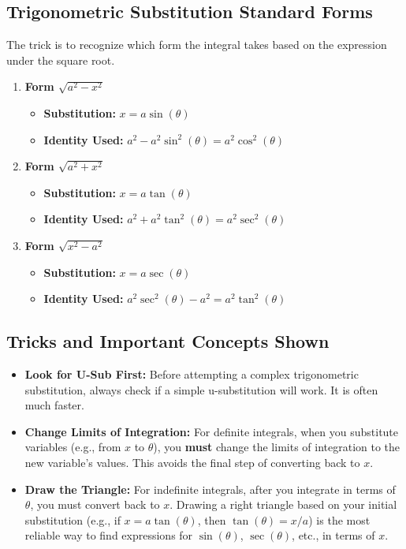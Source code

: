 \documentclass{article}
\begin{document}
\subsection*{Trigonometric Substitution Standard Forms}
The trick is to recognize which form the integral takes based on the expression under the square root.
\begin{enumerate}
    \item \textbf{Form $ \sqrt{a^2 - x^2} $}
    \begin{itemize}
        \item \textbf{Substitution:} $ x = a \sin(\theta) $
        \item \textbf{Identity Used:} $ a^2 - a^2\sin^2(\theta) = a^2\cos^2(\theta) $
    \end{itemize}

    \item \textbf{Form $ \sqrt{a^2 + x^2} $}
    \begin{itemize}
        \item \textbf{Substitution:} $ x = a \tan(\theta) $
        \item \textbf{Identity Used:} $ a^2 + a^2\tan^2(\theta) = a^2\sec^2(\theta) $
    \end{itemize}

    \item \textbf{Form $ \sqrt{x^2 - a^2} $}
    \begin{itemize}
        \item \textbf{Substitution:} $ x = a \sec(\theta) $
        \item \textbf{Identity Used:} $ a^2\sec^2(\theta) - a^2 = a^2\tan^2(\theta) $
    \end{itemize}
\end{enumerate}

\subsection*{Tricks and Important Concepts Shown}
\begin{itemize}
    \item \textbf{Look for U-Sub First:} Before attempting a complex trigonometric substitution, always check if a simple u-substitution will work. It is often much faster.
    
    \item \textbf{Change Limits of Integration:} For definite integrals, when you substitute variables (e.g., from $x$ to $\theta$), you \textbf{must} change the limits of integration to the new variable's values. This avoids the final step of converting back to $x$.
    
    \item \textbf{Draw the Triangle:} For indefinite integrals, after you integrate in terms of $\theta$, you must convert back to $x$. Drawing a right triangle based on your initial substitution (e.g., if $x = a \tan(\theta)$, then $\tan(\theta) = x/a$) is the most reliable way to find expressions for $\sin(\theta)$, $\sec(\theta)$, etc., in terms of $x$.
\end{itemize}
\end{document}
